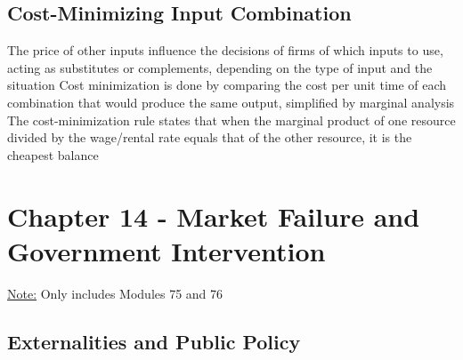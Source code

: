 \documentclass[11 pt, twoside]{article}
\newenvironment{outline*}
{
	\begin{outline}[enumerate]
	}
	{\end{outline}
}
\begin{document}
\subsection{Cost-Minimizing Input Combination}
\begin{outline*}
\1 The price of other inputs influence the decisions of firms of which inputs to use, acting as substitutes or complements, depending on the type of input and the situation
\1 Cost minimization is done by comparing the cost per unit time of each combination that would produce the same output, simplified by marginal analysis
\2 The cost-minimization rule states that when the marginal product of one resource divided by the wage/rental rate equals that of the other resource, it is the cheapest balance
\end{outline*}
\section{Chapter 14 - Market Failure and Government Intervention}
\underline{Note:} Only includes Modules 75 and 76
\subsection{Externalities and Public Policy}
\begin{outline*}

\end{outline*}
\end{document}
